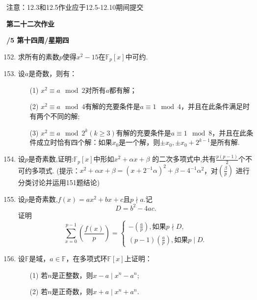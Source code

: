 \documentclass[a4paper,12pt]{article}
\begin{document}
{\color{red} 注意：12.3和12.5作业应于12.5-12.10期间提交}

\newpage
\head

\begin{center} %
	{\Large \bf 第二十二次作业} %
	\vspace{2mm}
	
	{\bf{}/5 \quad  第十四周/星期四} %
\end{center} 

\begin{enumerate}\setcounter{enumi}{151}

\item 求所有的素数$p$使得$x^2-15$在$\mathbb{F}_p[x]$中可约.

 \item 设$a$是奇数，则有：\begin{enumerate}
    \item[(1)] $x^2\equiv a \mod 2$对所有$a$都有解；
    \item[(2)] $x^2\equiv a \mod 4$有解的充要条件是$a\equiv 1 \mod 4$，并且在此条件满足时有两个不同的解;
    \item[(3)] $x^2\equiv a \mod 2^k(k\geq 3)$有解的充要条件是$a\equiv 1 \mod 8$，并且在此条件成立时恰有四个解：如果$x_0$是一个解，则$\pm x_0,\pm x_0+2^{k-1}$是所有解.
\end{enumerate}

\item 设$p$是奇素数,证明:$\mathbb{F}_p[x]$中形如$x^2+\alpha x+\beta$ 的二次多项式中,共有$\frac{p(p-1)}{2}$个不可约多项式.
 (提示：$x^2+\alpha x+\beta=(x+2^{-1}\alpha)^2+\beta-4^{-1}\alpha^2$，对$(\frac{\beta}{p})$
 进行分类讨论并运用151题结论)
 
 \item 设$p$是奇素数,$f(x)=ax^2+bx+c$且$p\nmid a$.记\begin{equation}
 D=b^2-4ac.\nonumber
 \end{equation}证明
 \begin{equation}\nonumber
 \sum_{x=0}^{p-1}(\frac{f(x)}{p})=\left\{
 \begin{aligned}
 -(\frac{a}{p}),如果p\nmid D,\\
 (p-1)(\frac{a}{p}),如果p\mid D.
 \end{aligned}
 \right.
 \end{equation}

 \item 设$\mathbb{F}$是域，$a\in \mathbb{F}$，在多项式环$\mathbb{F}[x]$上证明：\begin{enumerate}
    \item[(1)] 若$n$是正整数，则$x-a \mid x^n-a^n$;
    \item[(2)] 若$n$是正奇数，则$x+a \mid x^n+a^n$.
\end{enumerate}

\end{enumerate}
\end{document}
